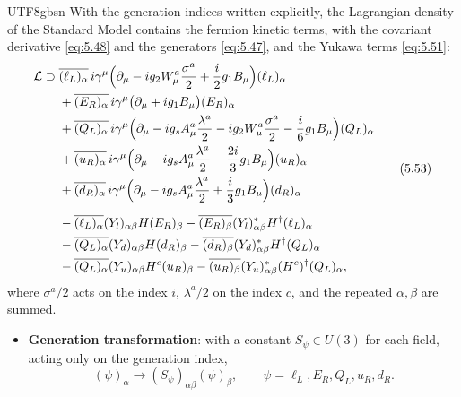 \documentclass[11pt,a4paper,oneside]{report}
\begin{document}
\begin{CJK*}{UTF8}{gbsn}
With the generation indices written explicitly, the Lagrangian density of the Standard Model contains the fermion kinetic terms, with the covariant derivative \eqref{eq:5.48} and the generators \eqref{eq:5.47}, and the Yukawa terms \eqref{eq:5.51}:
\begin{equation*}
\begin{aligned}
\mathcal L\supset{}&\overline{(\ell_L)_\alpha}\,i\gamma^\mu\Bigl(\partial_\mu-ig_2W_\mu^a\frac{\sigma^a}2+\frac i2g_1B_\mu\Bigr)(\ell_L)_\alpha\\
&+\overline{(E_R)_\alpha}\,i\gamma^\mu\bigl(\partial_\mu+ig_1B_\mu\bigr)(E_R)_\alpha\\
&+\overline{(Q_L)_\alpha}\,i\gamma^\mu\Bigl(\partial_\mu-ig_sA_\mu^a\frac{\lambda^a}2-ig_2W_\mu^a\frac{\sigma^a}2-\frac i6g_1B_\mu\Bigr)(Q_L)_\alpha\\
&+\overline{(u_R)_\alpha}\,i\gamma^\mu\Bigl(\partial_\mu-ig_sA_\mu^a\frac{\lambda^a}2-\frac{2i}3g_1B_\mu\Bigr)(u_R)_\alpha\\
&+\overline{(d_R)_\alpha}\,i\gamma^\mu\Bigl(\partial_\mu-ig_sA_\mu^a\frac{\lambda^a}2+\frac i3g_1B_\mu\Bigr)(d_R)_\alpha\\[6pt]
&-\overline{(\ell_L)_\alpha}(Y_l)_{\alpha\beta}H(E_R)_\beta-\overline{(E_R)_\beta}(Y_l)^*_{\alpha\beta}H^\dagger(\ell_L)_\alpha\\
&-\overline{(Q_L)_\alpha}(Y_d)_{\alpha\beta}H(d_R)_\beta-\overline{(d_R)_\beta}(Y_d)^*_{\alpha\beta}H^\dagger(Q_L)_\alpha\\
&-\overline{(Q_L)_\alpha}(Y_u)_{\alpha\beta}H^c(u_R)_\beta-\overline{(u_R)_\beta}(Y_u)^*_{\alpha\beta}(H^c)^\dagger(Q_L)_\alpha,
\end{aligned}
\tag{5.53}\label{eq:5.53}
\end{equation*}
where $\sigma^a/2$ acts on the index $i$, $\lambda^a/2$ on the index $c$, and the repeated $\alpha,\beta$ are summed.
\begin{itemize}


\item \textbf{\boldmath Generation transformation}: with a constant $S_\psi\in U(3)$ for each field, acting only on the generation index,
\begin{equation*}
(\psi)_\alpha\to(S_\psi)_{\alpha\beta}(\psi)_\beta,\qquad\psi=\ell_L,E_R,Q_L,u_R,d_R .
\tag{5.54}\label{eq:5.54}
\end{equation*}
\end{itemize}


\end{CJK*}
\end{document}
